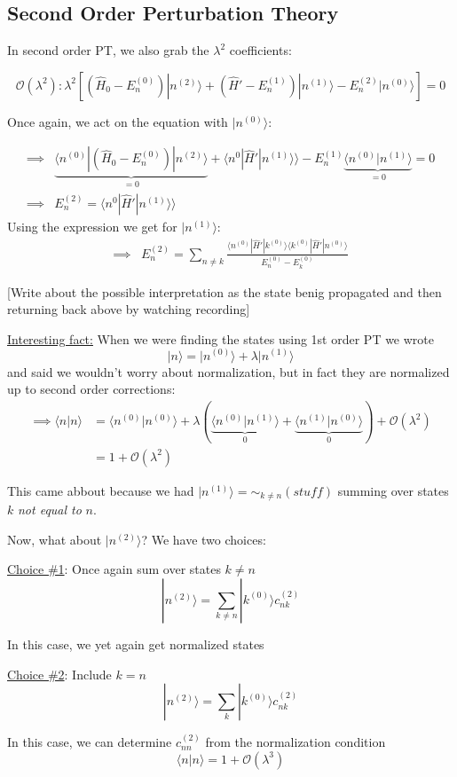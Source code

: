 \documentclass{article}
\newcommand{\ket}[1]{|#1 \rangle}
\newcommand{\inner}[2]{\langle #1 | #2 \rangle}
\begin{document}
\subsection{Second Order Perturbation Theory}
In second order PT, we also grab the $\lambda^2$ coefficients:

\[ \mathcal{O}(\lambda^2) : \lambda^2 \left[ (\hat{H}_0 - E_n^{(0)}) \ket{n^{(2)}} + (\hat{H}' - E_n^{(1)}) \ket{n^{(1)}} - E_n^{(2)}\ket{n^{(0)}} \right] = 0 \]

\vskip 0.5cm
Once again, we act on the equation with $\ket{n^{(0)}}$:

\begin{align*}
  \implies& \underbrace{\inner{n^{(0)}}{(\hat{H}_0 - E_n^{(0)})|n^{(2)}}}_{=0} + \inner{n^{0}}{\hat{H}' \ket{n^{(1)}}} - E_n^{(1)}\underbrace{\inner{n^{(0)}}{n^{(1)}}}_{=0} = 0 \\
  \implies& \boxed{E_n^{(2)} = \inner{n^{0}}{\hat{H}' \ket{n^{(1)}}}}
\end{align*}
Using the expression we get for $\ket{n^{(1)}}$:
\begin{align*}
  \implies& E_n^{(2)} = \sum_{n \neq k} \frac{\inner{n^{(0)}}{\hat{H}'| k^{(0)}} \inner{k^{(0)}}{\hat{H}'|n^{(0)}} }{E_n^{(0)} - E_k^{(0)}}
\end{align*}

\vskip 0.5cm
[Write about the possible interpretation as the state benig propagated and then returning back above by watching recording]

\vskip 0.5cm
\underline{Interesting fact:} When we were finding the states using 1st order PT we wrote 
\[ \ket{n} = \ket{n^{(0)}} + \lambda \ket{n^{(1)}} \]
and said we wouldn't worry about normalization, but in fact they are normalized up to second order corrections:
\begin{align*}
  \implies \inner{n}{n} &= \inner{n^{(0)}}{n^{(0)}} + \lambda \left( \underbrace{\inner{n^{(0)}}{n^{(1)}}}_{0} + \underbrace{\inner{n^{(1)}}{n^{(0)}}}_{0} \right) + \mathcal{O}(\lambda^2) \\
  &= 1 + \mathcal{O}(\lambda^2)
\end{align*}

This came abbout because we had $\ket{n^{(1)}} = \sim_{k \neq n} (stuff)$ summing over states $k$ \emph{not equal to} $n$.

\vskip 0.5cm
\begin{dottedbox}
  Now, what about $\ket{n^{(2)}}$? We have two choices:

\vskip 0.5cm
\underline{Choice \#1}: Once again sum over states $k \neq n$
\[\ket{n^{(2)}} = \sum_{k \neq n} \ket{k^{(0)}}  c_{nk}^{(2)} \]


In this case, we yet again get normalized states

\vskip 0.5cm
\underline{Choice \#2}: Include $k = n$
\[\ket{n^{(2)}} = \sum_{k} \ket{k^{(0)}}  c_{nk}^{(2)} \]


In this case, we can determine $c_{nn}^{(2)}$ from the normalization condition
\[ \inner{n}{n} = 1 + \mathcal{O}(\lambda^3) \]
\end{dottedbox}
\end{document}
